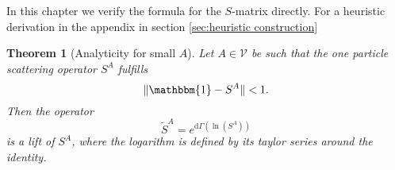 \documentclass[b5paper,draft,openbib,12pt]{memoir}
\newtheorem{Thm}[Def]{Theorem}
\newcommand{\id}{\mathbbm{1}}
\begin{document}
In this chapter we verify the formula for the \(S\)-matrix directly.
For a heuristic derivation in the appendix in 
section \ref{sec:heuristic construction}


\begin{Thm}[Analyticity for small \(A\)]\label{sleek_second_quantised_scattering_operator}
Let \(A\in\mathcal{V}\) be such that the one 
particle scattering operator \(S^A\) fulfills
\begin{equation}
\|\id-S^A\|<1.
\end{equation}\label{eq:sleek_scattering}
Then the operator 
\begin{equation}\label{eq:sleek_second_quantised_scattering_operator}
\tilde{S}^A=  e^{\mathrm{d}\Gamma(\ln (S^A))}
\end{equation}
is a lift of \(S^A\), where the logarithm is defined by its 
taylor series around the identity.
\end{Thm}
\end{document}
